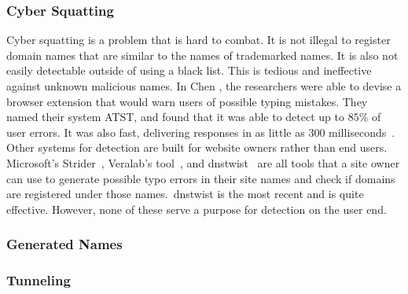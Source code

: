 \subsubsection{Cyber Squatting}

Cyber squatting is a problem that is hard to combat.
It is not illegal to register domain names that are similar to the names of trademarked names.
It is also not easily detectable outside of using a black list.
This is tedious and ineffective against unknown malicious names.
In Chen \etal{}, the researchers were able to devise a browser extension that would warn users of
possible typing mistakes.
They named their system ATST, and found that it was able to detect up to $85\%$ of user errors.
It was also fast, delivering responses in as little as $300$ milliseconds~\cite{squat}.
Other systems for detection are built for website owners rather than end users.
Microsoft's Strider~\cite{strider}, Veralab's tool~\cite{veralab}, and dnstwist~\cite{elceef} are
all tools that a site owner can use to generate possible typo errors in their site names and check
if domains are registered under those names.\
dnstwist is the most recent and is quite effective.
However, none of these serve a purpose for detection on the user end.

\subsubsection{Generated Names}

\subsubsection{Tunneling}

